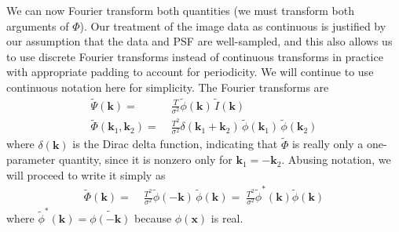 \documentclass[10pt]{article}
\begin{document}
We can now Fourier transform both quantities (we must transform both arguments of $\Phi$).  Our treatment of the image data as continuous is justified by our assumption that the data and PSF are well-sampled, and this also allows us to use discrete Fourier transforms instead of continuous transforms in practice with appropriate padding to account for periodicity.  We will continue to use continuous notation here for simplicity.  The Fourier transforms are
\begin{align}
\tilde{\Psi}(\bm{k}) =\;&
    \frac{T}{\sigma^2}\tilde{\phi}(\bm{k}) \, \tilde{I}(\bm{k}) \\
\tilde{\Phi}(\bm{k}_1,\bm{k}_2) =\;&
    \frac{T^2}{\sigma^2}
    \delta(\bm{k}_1+\bm{k}_2)\,
    \tilde{\phi}(\bm{k}_1) \, \tilde{\phi}(\bm{k}_2)
\end{align}
where $\delta(\bm{k})$ is the Dirac delta function, indicating that $\tilde{\Phi}$ is really only a one-parameter quantity, since it is nonzero only for $\bm{k}_1 = -\bm{k}_2$.  Abusing notation, we will proceed to write it simply as
\begin{align}
\tilde{\Phi}(\bm{k}) =\;&
    \frac{T^2}{\sigma^2} \tilde{\phi}(-\bm{k})\,\tilde{\phi}(\bm{k})
    =\; \frac{T^2}{\sigma^2} \tilde{\phi}^*(\bm{k}) \tilde{\phi}(\bm{k})
\end{align}
where $\tilde{\phi}^*(\bm{k})=\tilde{\phi(-\bm{k})}$ because $\phi(\bm{x})$ is real.
\end{document}
